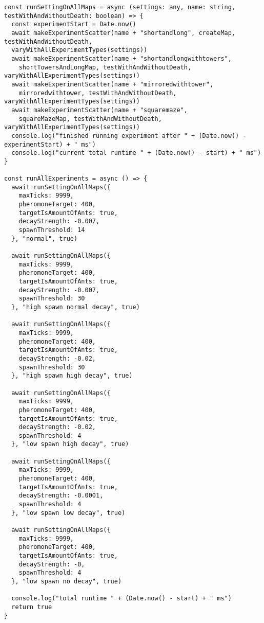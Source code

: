 \begin{lstlisting}
const runSettingOnAllMaps = async (settings: any, name: string, testWithAndWithoutDeath: boolean) => {
  const experimentStart = Date.now()
  await makeExperimentScatter(name + "shortandlong", createMap, testWithAndWithoutDeath,
  varyWithAllExperimentTypes(settings))
  await makeExperimentScatter(name + "shortandlongwithtowers",
    shortTowersAndLongMap, testWithAndWithoutDeath, varyWithAllExperimentTypes(settings))
  await makeExperimentScatter(name + "mirroredwithtower",
    mirroredwithtower, testWithAndWithoutDeath, varyWithAllExperimentTypes(settings))
  await makeExperimentScatter(name + "squaremaze",
    squareMazeMap, testWithAndWithoutDeath, varyWithAllExperimentTypes(settings))
  console.log("finished running experiment after " + (Date.now() - experimentStart) + " ms")
  console.log("current total runtime " + (Date.now() - start) + " ms")
}

const runAllExperiments = async () => {
  await runSettingOnAllMaps({
    maxTicks: 9999,
    pheromoneTarget: 400,
    targetIsAmountOfAnts: true,
    decayStrength: -0.007,
    spawnThreshold: 14
  }, "normal", true)

  await runSettingOnAllMaps({
    maxTicks: 9999,
    pheromoneTarget: 400,
    targetIsAmountOfAnts: true,
    decayStrength: -0.007,
    spawnThreshold: 30
  }, "high spawn normal decay", true)

  await runSettingOnAllMaps({
    maxTicks: 9999,
    pheromoneTarget: 400,
    targetIsAmountOfAnts: true,
    decayStrength: -0.02,
    spawnThreshold: 30
  }, "high spawn high decay", true)

  await runSettingOnAllMaps({
    maxTicks: 9999,
    pheromoneTarget: 400,
    targetIsAmountOfAnts: true,
    decayStrength: -0.02,
    spawnThreshold: 4
  }, "low spawn high decay", true)

  await runSettingOnAllMaps({
    maxTicks: 9999,
    pheromoneTarget: 400,
    targetIsAmountOfAnts: true,
    decayStrength: -0.0001,
    spawnThreshold: 4
  }, "low spawn low decay", true)

  await runSettingOnAllMaps({
    maxTicks: 9999,
    pheromoneTarget: 400,
    targetIsAmountOfAnts: true,
    decayStrength: -0,
    spawnThreshold: 4
  }, "low spawn no decay", true)

  console.log("total runtime " + (Date.now() - start) + " ms")
  return true
}


\end{lstlisting}
